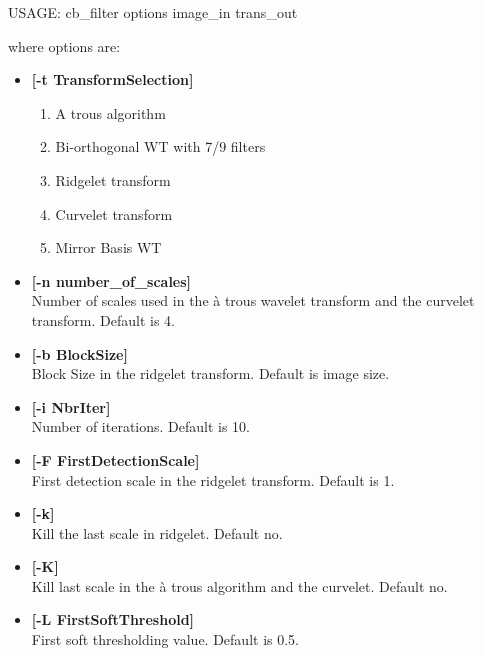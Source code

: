 {\bf
\begin{center}
 USAGE: cb\_filter options image\_in trans\_out
\end{center}}
where options are:
\begin{itemize}
\baselineskip=0.4truecm
\itemsep=0.1truecm
 \item {\bf [-t TransformSelection]}
\begin{enumerate}
\baselineskip=0.4truecm
\itemsep=0.1truecm
\item A trous algorithm
\item Bi-orthogonal WT with 7/9 filters
\item Ridgelet transform
\item Curvelet transform
\item Mirror Basis WT
\end{enumerate}

\item {\bf [-n number\_of\_scales]} \\
Number of scales used in the \`a trous wavelet transform 
 and the curvelet transform. 
Default is 4.

\item {\bf [-b BlockSize]}  \\
 Block Size in the ridgelet transform.
Default is image size.  

\item {\bf [-i NbrIter]}  \\
Number of iterations. Default is 10.

\item {\bf [-F FirstDetectionScale]} \\
First detection scale in the ridgelet transform.
Default is 1. 

\item {\bf [-k]} \\
Kill the last scale in ridgelet. %
Default no.

\item {\bf  [-K]} \\
Kill last scale in the \`a trous algorithm and the curvelet. %
Default no.

\item {\bf  [-L FirstSoftThreshold]} \\
First soft thresholding value. Default is 0.5.


\end{itemize}
